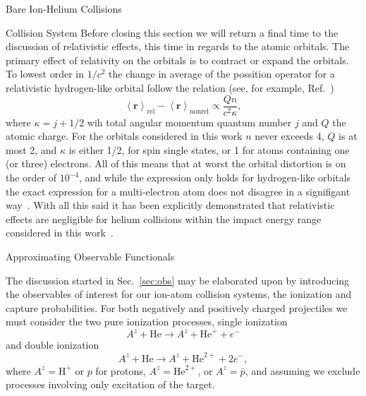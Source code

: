 \documentclass[letterpaper, 11 pt]{report}
\begin{document}
\begin{chapter}{Bare Ion-Helium Collisions \label{chap:p-he2p-he}}
\begin{section}{Collision System \label{sec:p-he2p-he-sys}}
      Before closing this section we will return a final time to the discussion of relativistic effects,
      this time in regards to the atomic orbitals. The primary effect of relativity on the orbitals is
      to contract or expand the orbitals. To lowest order in $1/c^2$ the change in average of the
      possition operator for a relativistic hydrogen-like orbital follow the relation (see, for example,
      Ref.~\cite{relorb})
      \begin{equation} \label{eq:radDiff}
         \left< \mathbf{r} \right>_\mathrm{rel}
       - \left< \mathbf{r} \right>_\mathrm{nonrel} \propto \frac{Q n}{c^2 \kappa},
      \end{equation}
      where $\kappa = j + 1/2$ wih total angular momentum quantum number $j$ and $Q$ the atomic charge.
      For the orbitals considered in this work $n$ never exceeds 4, $Q$ is at most 2, and $\kappa$ is
      either 1/2, for spin single states, or 1 for atoms containing one (or three) electrons. All of
      this means that at worst the orbital distortion is on the order of $10^{-4}$, and while the
      expression only holds for hydrogen-like orbitals the exact expression for a multi-electron atom
      does not disagree in a signifigant way~\cite{relorb}. With all this said it has been explicitly
      demonstrated that relativistic effects are negligible for helium collisions within the impact
      energy range considered in this work~\cite{relCollision}.

   \end{section}

   \begin{section}{Approximating Observable Functionals \label{sec:phe2p-obs}}

      The discussion started in Sec.~\ref{sec:obs} may be elaborated upon by introducing the observables
      of interest for our ion-atom collision systems, the ionization and capture probabilities. For both
      negatively and positively charged projectiles we must consider the two pure ionization processes,
      single ionization
      \begin{equation} \label{eq:TI}
         A^z + \mathrm{He} \rightarrow A^z + \mathrm{He}^+ + e^-
      \end{equation}
      and double ionization
      \begin{equation} \label{eq:II}
         A^z + \mathrm{He} \rightarrow A^z + \mathrm{He}^{2+} + 2e^-,
      \end{equation}
      where $A^z = \mathrm{H}^+$ or $p$ for protons, $A^z = \mathrm{He}^{2+}$, or $A^z = \bar{p}$, and
      assuming we exclude processes involving only excitation of the target.


\end{section}
\end{chapter}
\end{document}
